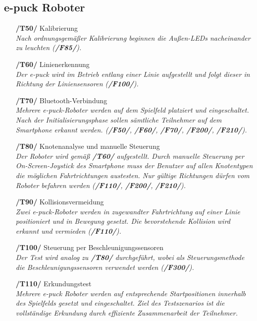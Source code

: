 \documentclass[10pt,a4paper]{article}
\begin{document}
		\subsection{e-puck Roboter}
			\begin{itemize}
				\item[\textbf{/T50/}] Kalibrierung
					\\ \textsl{Nach ordnungsgemäßer Kalibrierung beginnen die Außen-LEDs nacheinander zu leuchten (\textbf{/F85/}).}
				\item[\textbf{/T60/}] Linienerkennung
					\\ \textsl{Der e-puck wird im Betrieb entlang einer Linie aufgestellt und folgt dieser in Richtung der
						Liniensensoren (\textbf{/F100/}).}		
				\item[\textbf{/T70/}] Bluetooth-Verbindung
					\\ \textsl{Mehrere e-puck-Roboter werden auf dem Spielfeld platziert und eingeschaltet. Nach der Initialisierungsphase
						sollen sämtliche Teilnehmer auf dem Smartphone erkannt werden. (\textbf{/F50/}, \textbf{/F60/}, \textbf{/F70/}, 
						\textbf{/F200/}, \textbf{/F210/}).}								
				\item[\textbf{/T80/}] Knotenanalyse und manuelle Steuerung
					\\ \textsl{Der Roboter wird gemäß \textbf{/T60/} aufgestellt. Durch manuelle Steuerung per On-Screen-Joystick des
						Smartphone muss der Benutzer 	auf allen Knotentypen die möglichen Fahrtrichtungen austesten. Nur gültige Richtungen
						dürfen vom Roboter befahren werden (\textbf{/F110/},	\textbf{/F200/}, \textbf{/F210/}).}							
				\item[\textbf{/T90/}] Kollisionsvermeidung
					\\ \textsl{Zwei e-puck-Roboter werden in zugewandter Fahrtrichtung auf einer Linie positioniert und in Bewegung gesetzt.
						Die bevorstehende Kollision wird erkannt und vermieden (\textbf{/F110/}).}		
				\item[\textbf{/T100/}] Steuerung per Beschleunigungssensoren
					\\ \textsl{Der Test wird analog zu \textbf{/T80/} durchgeführt, wobei als Steuerungsmethode die Beschleunigungssensoren
						verwendet werden (\textbf{/F300/}).}
				\item[\textbf{/T110/}] Erkundungstest
					\\ \textsl{Mehrere e-puck Roboter werden auf entsprechende Startpositionen innerhalb des Spielfelds gesetzt und
						eingeschaltet. Ziel des Testszenarios ist die vollständige Erkundung durch effiziente Zusammenarbeit der Teilnehmer.
}
\end{itemize}
\end{document}
